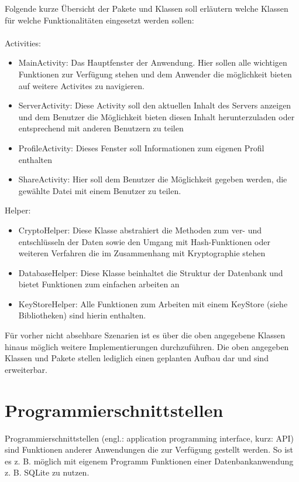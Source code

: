 \documentclass[10pt, a4paper,headsepline]{scrreprt}
\begin{document}
Folgende kurze Übersicht der Pakete und Klassen soll erläutern welche Klassen für welche Funktionalitäten eingesetzt werden sollen:\\ \\
Activities:
\begin{itemize}
\item MainActivity: Das Hauptfenster der Anwendung. Hier sollen alle wichtigen Funktionen zur Verfügung stehen und dem Anwender die möglichkeit bieten auf weitere Activites zu navigieren.
\item ServerActivity: Diese Activity soll den aktuellen Inhalt des Servers anzeigen und dem Benutzer die Möglichkeit bieten diesen Inhalt herunterzuladen oder entsprechend mit anderen Benutzern zu teilen
\item ProfileActivity: Dieses Fenster soll Informationen zum eigenen Profil enthalten
\item ShareActivity: Hier soll dem Benutzer die Möglichkeit gegeben werden, die gewählte Datei mit einem Benutzer zu teilen.
\end{itemize}
Helper:
\begin{itemize}
\item CryptoHelper: Diese Klasse abstrahiert die Methoden zum ver- und entschlüsseln der Daten sowie den Umgang mit Hash-Funktionen oder weiteren Verfahren die im Zusammenhang mit Kryptographie stehen
\item DatabaseHelper: Diese Klasse beinhaltet die Struktur der Datenbank und bietet Funktionen zum einfachen arbeiten an
\item KeyStoreHelper: Alle Funktionen zum Arbeiten mit einem KeyStore (siehe Bibliotheken) sind hierin enthalten.
\end{itemize}
Für vorher nicht absehbare Szenarien ist es über die oben angegebene Klassen hinaus möglich weitere Implementierungen durchzuführen. Die oben angegeben Klassen und Pakete stellen lediglich einen geplanten Aufbau dar und sind erweiterbar.


\section{Programmierschnittstellen}
Programmierschnittstellen (engl.: application programming interface, kurz: API) sind Funktionen anderer Anwendungen die zur Verfügung gestellt werden. So ist es z. B. möglich mit eigenem Programm Funktionen einer Datenbankanwendung z. B. SQLite zu nutzen.
\end{document}
